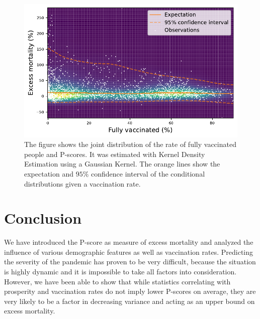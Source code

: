 \documentclass{article}
\begin{document}
\begin{figure}[t]
	\centering
	\includegraphics[width=0.67\linewidth]{fig/fig_kernel_density_em}
	\caption[Distribution Vaccinations and Excess Mortality]{The figure shows the joint distribution of the rate of fully vaccinated people and P-scores. It was estimated with Kernel Density Estimation using a Gaussian Kernel. The orange lines show the expectation and $95\%$ confidence interval of the conditional distributions given a vaccination rate.}
	\label{fig:kde}
\end{figure}

\section{Conclusion}

We have introduced the P-score as measure of excess mortality and analyzed the influence of various demographic features as well as vaccination rates. Predicting the severity of the pandemic has proven to be very difficult, because the situation is highly dynamic and it is impossible to take all factors into consideration. However, we have been able to show that while statistics correlating with prosperity and vaccination rates do not imply lower P-scores on average, they are very likely to be a factor in decreasing variance and acting as an upper bound on excess mortality.

\small


\end{document}
